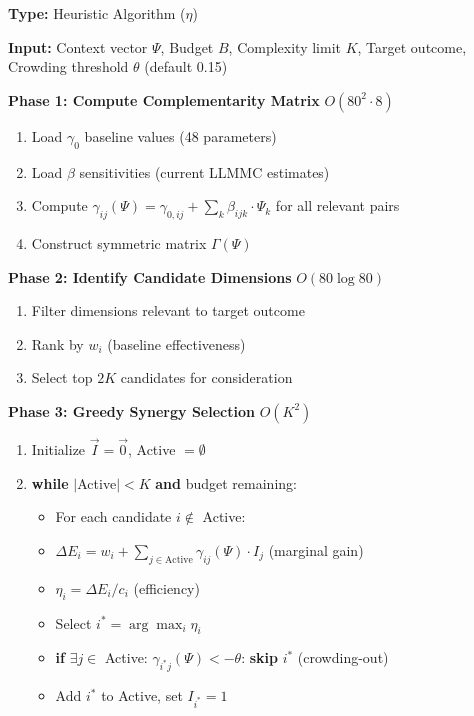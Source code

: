 \begin{tcolorbox}[colback=green!5!white, colframe=green!75!black,
    title=\textbf{Algorithm EIT-EMP-2-A1: EMERGE (Emergent Intervention Selection)}]

\textbf{Type:} Heuristic Algorithm ($\eta$)

\textbf{Input:} Context vector $\Psi$, Budget $B$, Complexity limit $K$, Target outcome, Crowding threshold $\theta$ (default 0.15)

\textbf{Phase 1: Compute Complementarity Matrix} \hfill $O(80^2 \cdot 8)$
\begin{enumerate}[nosep]
    \item Load $\gamma_0$ baseline values (48 parameters)
    \item Load $\beta$ sensitivities (current LLMMC estimates)
    \item Compute $\gamma_{ij}(\Psi) = \gamma_{0,ij} + \sum_k \beta_{ijk} \cdot \Psi_k$ for all relevant pairs
    \item Construct symmetric matrix $\Gamma(\Psi)$
\end{enumerate}

\textbf{Phase 2: Identify Candidate Dimensions} \hfill $O(80 \log 80)$
\begin{enumerate}[nosep]
    \item Filter dimensions relevant to target outcome
    \item Rank by $w_i$ (baseline effectiveness)
    \item Select top $2K$ candidates for consideration
\end{enumerate}

\textbf{Phase 3: Greedy Synergy Selection} \hfill $O(K^2)$
\begin{enumerate}[nosep]
    \item Initialize $\vec{I} = \vec{0}$, Active $= \emptyset$
    \item \textbf{while} $|$Active$| < K$ \textbf{and} budget remaining:
    \begin{itemize}[nosep]
        \item For each candidate $i \notin$ Active:
        \item \quad $\Delta E_i = w_i + \sum_{j \in \text{Active}} \gamma_{ij}(\Psi) \cdot I_j$ \hfill (marginal gain)
        \item \quad $\eta_i = \Delta E_i / c_i$ \hfill (efficiency)
        \item Select $i^* = \arg\max_i \eta_i$
        \item \textbf{if} $\exists j \in$ Active: $\gamma_{i^*j}(\Psi) < -\theta$: \textbf{skip} $i^*$ \hfill (crowding-out)
        \item Add $i^*$ to Active, set $I_{i^*} = 1$
    \end{itemize}
\end{enumerate}


\end{tcolorbox}
